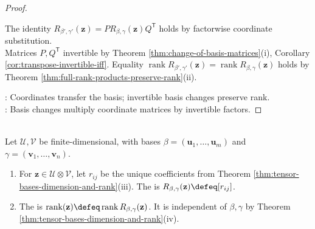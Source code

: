 \begin{theorem}
\begin{proof}
\begin{enumerate}[label=(\roman*)]
The identity $R_{\beta',\gamma'}(\mathbf{z})=P R_{\beta,\gamma}(\mathbf{z})Q^{\mathsf{T}}$ holds by factorwise coordinate substitution.\\
Matrices $P,Q^{\mathsf{T}}$ invertible by Theorem \ref{thm:change-of-basis-matrices}(i), Corollary \ref{cor:transpose-invertible-iff}. Equality $\operatorname{rank}R_{\beta',\gamma'}(\mathbf{z})=\operatorname{rank}R_{\beta,\gamma}(\mathbf{z})$ holds by Theorem \ref{thm:full-rank-products-preserve-rank}(ii).
\end{enumerate}
: Coordinates transfer the basis; invertible basis changes preserve rank.\\
: Basis changes multiply coordinate matrices by invertible factors.
\end{proof}
\end{theorem}

\begin{definition} \label{def:tensor-coordinate-matrix-and-rank} \\
Let $\mathcal{U},\mathcal{V}$ be finite-dimensional, with bases $\beta=(\mathbf{u}_1,\ldots,\mathbf{u}_m)$ and $\gamma=(\mathbf{v}_1,\ldots,\mathbf{v}_n)$.
\begin{enumerate}[label=(\roman*)]
\setlength{\itemsep}{0pt}
\item For $\mathbf{z}\in\mathcal{U}\otimes\mathcal{V}$, let $r_{ij}$ be the unique coefficients from Theorem \ref{thm:tensor-bases-dimension-and-rank}(iii). The  is $R_{\beta,\gamma}(\mathbf{z})\defeq[r_{ij}]$.
\item The  is $\operatorname{rank}(\mathbf{z})\defeq\operatorname{rank}R_{\beta,\gamma}(\mathbf{z})$. It is independent of $\beta,\gamma$ by Theorem \ref{thm:tensor-bases-dimension-and-rank}(iv).
\end{enumerate}
\end{definition}

